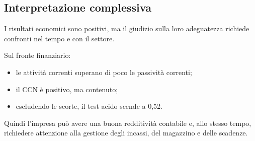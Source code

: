 \subsection*{Interpretazione complessiva}

\noindent I risultati economici
sono positivi,
ma il giudizio sulla loro adeguatezza
richiede confronti nel tempo
e con il settore.

\noindent Sul fronte finanziario:

\begin{itemize}
    \item le attività correnti
    superano di poco
    le passività correnti;

    \item il CCN è positivo,
    ma contenuto;

    \item escludendo le scorte,
    il test acido scende a 0,52.
\end{itemize}

\noindent Quindi l'impresa può avere
una buona redditività contabile
e, allo stesso tempo,
richiedere attenzione
alla gestione degli incassi,
del magazzino e delle scadenze.
